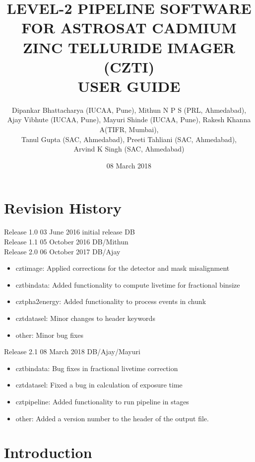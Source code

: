 \documentclass[11pt,oneside,a4paper]{article}
\begin{document}
\title{\vspace{+2.0cm}  LEVEL-2 PIPELINE SOFTWARE FOR ASTROSAT CADMIUM ZINC TELLURIDE IMAGER (CZTI)\\ USER GUIDE}
\author{Dipankar Bhattacharya (IUCAA, Pune), Mithun N P S (PRL, Ahmedabad),\\ 
Ajay Vibhute (IUCAA, Pune), Mayuri Shinde (IUCAA, Pune), Rakesh Khanna A(TIFR, Mumbai),\\
Tanul Gupta (SAC, Ahmedabad), Preeti Tahliani (SAC, Ahmedabad), \\
Arvind K Singh (SAC, Ahmedabad)}
\date{08 March 2018}
\maketitle

\newpage
\section*{Revision History}
Release 1.0  03 June 2016   initial release  DB \\
Release 1.1 05 October 2016 DB/Mithun \\
Release 2.0 06 October 2017 DB/Ajay
\begin{itemize}
	\item cztimage: Applied corrections for the detector and mask misalignment
	\item cztbindata: Added functionality to compute livetime for fractional binsize
	\item cztpha2energy: Added functionality to process events in chunk
	\item cztdatasel: Minor changes to header keywords
	\item other: Minor bug fixes
\end{itemize}
Release 2.1 08 March 2018 DB/Ajay/Mayuri
\begin{itemize}
	\item cztbindata: Bug fixes in fractional livetime correction
	\item cztdatasel: Fixed a bug in calculation of exposure time
	\item cztpipeline: Added functionality to run pipeline in stages
	\item other: Added a version number to the header of the output file.
\end{itemize}
\newpage

\tableofcontents

\newpage

\section{Introduction}
\end{document}
